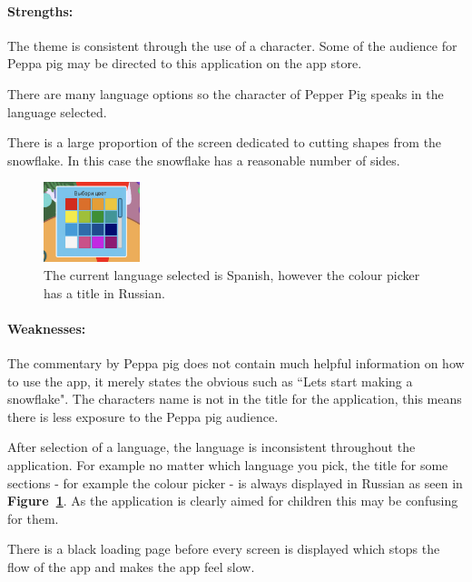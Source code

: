 \documentclass[11pt]{article}
\begin{document}
                \paragraph{Strengths:}
                The theme is consistent through the use of a character. Some of the audience for Peppa pig may be directed to this application on the app store.
                
                There are many language options so the character of Pepper Pig speaks in the language selected.
                
                There is a large proportion of the screen dedicated to cutting shapes from the snowflake. In this case the snowflake has a reasonable number of sides. 

                \begin{figure}
                    \includegraphics[width=0.25\textwidth]{Images/peppa/peppaRussian.png}
                    \caption{The current language selected is Spanish, however the colour picker has a title in Russian.}
                    \label{fig:peppaRussian}
                \end{figure}
                \paragraph{Weaknesses:}
                The commentary by Peppa pig does not contain much helpful information on how to use the app, it merely states the obvious such as ``Lets start making a snowflake". The characters name is not in the title for the application, this means there is less exposure to the Peppa pig audience.
                
                After selection of a language, the language is inconsistent throughout the application. For example no matter which language you pick, the title for some sections - for example the colour picker - is always displayed in Russian as seen in \textbf{Figure~\ref{fig:peppaRussian}}.  As the application is clearly aimed for children this may be confusing for them.
                
                There is a black loading page before every screen is displayed which stops the flow of the app and makes the app feel slow.
\end{document}
